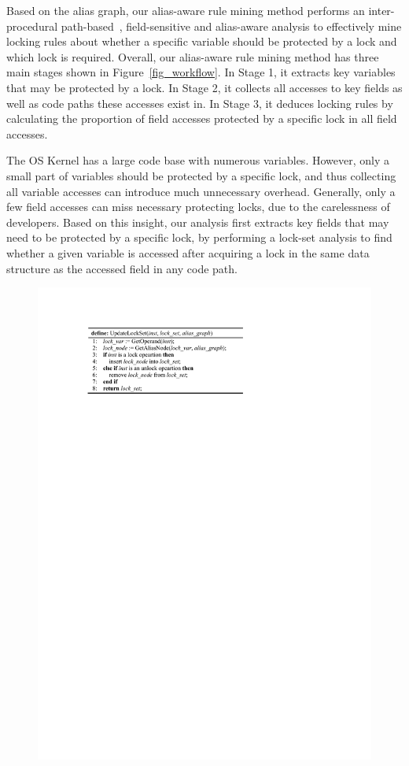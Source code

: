 Based on the alias graph, our alias-aware rule mining method performs an 
inter-procedural path-based~\cite{Li:ASPLOS22}, field-sensitive and alias-aware 
analysis to effectively mine locking rules about whether a specific variable 
should be protected by a lock and which lock is required. Overall, our 
alias-aware rule mining method has three main stages shown in 
Figure~\ref{fig_workflow}. In Stage 1, it extracts key variables that may be 
protected by a lock. In Stage 2, it collects all accesses to key fields as well 
as code paths these accesses exist in. In Stage 3, it deduces locking rules by 
calculating the proportion of field accesses protected by a specific lock in 
all field accesses. 

 The OS Kernel has a large code base with 
numerous variables. However, only a small part of variables should be protected 
by a specific lock, and thus collecting all variable accesses can introduce 
much unnecessary overhead. Generally, only a few field accesses can miss 
necessary protecting locks, due to the carelessness of developers. Based on 
this insight, our analysis first extracts key fields that may need to be 
protected by a specific lock, by performing a lock-set analysis to find whether 
a given variable is accessed after acquiring a lock in the same data structure 
as the accessed field in any code path.

\begin{figure}[htbp]
	\centering
	\includegraphics[width=0.9\linewidth]{figures/fig_pseudocode_lock_set.pdf}
	\label{fig_pseudocode_lock_set}
\end{figure}

